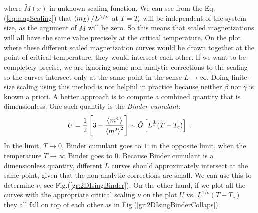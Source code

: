 where $\tilde{M}(x)$ in unknown scaling function. We can see from the Eq.(\ref{eq:magScaling}) that $\expval{m_L}/L^{\beta / \nu}$ at $T=T_c$ will be independent of the system size, as the argument of $\tilde{M}$ will be zero. So this means that scaled magnetizations will all have the same value precisely at the critical temperature. On the plot where these different scaled magnetization curves would be drawn together at the point of critical temperature, they would intersect each other. If we want to be completely precise, we are ignoring some non-analytic corrections to the scaling so the curves intersect only at the same point in the sense $L\rightarrow\infty$. Doing finite-size scaling using this method is not helpful in practice because neither $\beta$ nor $\gamma$ is known a priori. A better approach is to compute a combined quantity that is dimensionless. One such quantity is the \textit{Binder cumulant}\cite{bindeCumulant}:
\begin{equation}
	U = \frac{1}{2} \left[3 - \frac{\expval{m^4}}{\expval{m^2}^2}\right] \sim \tilde{G}\left[L^{\frac{1}{\nu}}(T-T_c)\right] \ .
\end{equation}
In the limit, $T\rightarrow 0$, Binder cumulant goes to $1$; in the opposite limit, when the temperature $T\rightarrow \infty$ Binder goes to $0$. Because Binder cumulant is a dimensionless quantity, different $L$ curves should approximately intersect at the same point, given that the non-analytic corrections are small. We can use this to determine $\nu$, see Fig.(\ref{gr:2DIsingBinder}). On the other hand, if we plot all the curves with the appropriate critical scaling $\nu$ on the plot $U$ vs. $L^{1/\nu}(T-T_c)$ they all fall on top of each other as in Fig.(\ref{gr:2DIsingBinderCollaps}).

